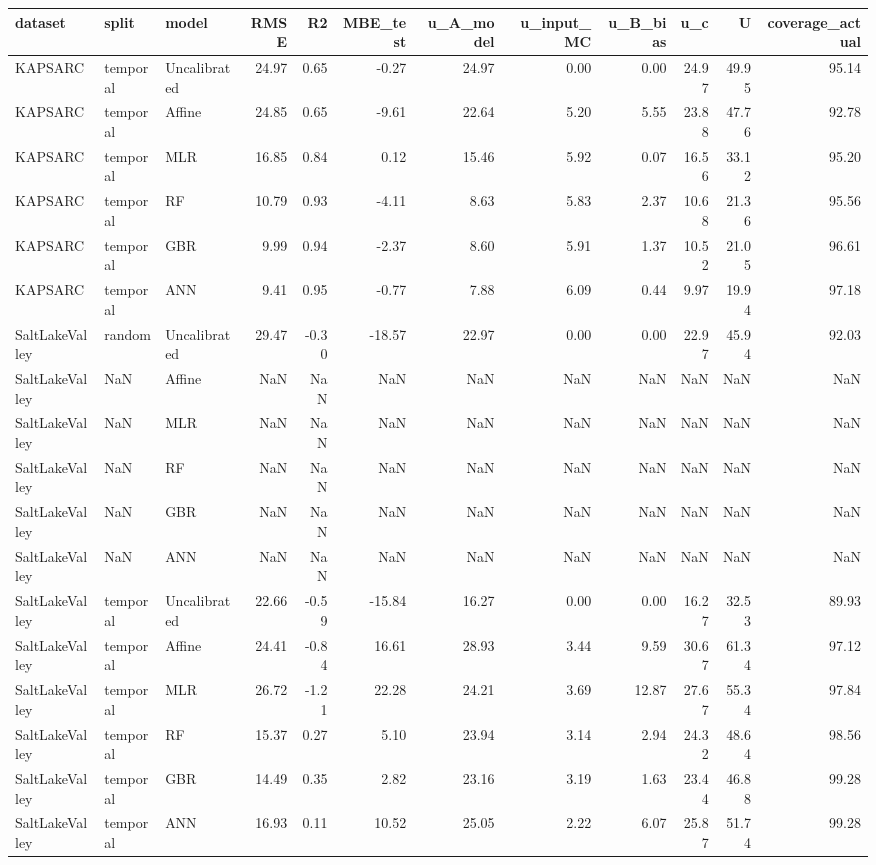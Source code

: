 \begin{tabular}{lllrrrrrrrrr}
\toprule
dataset & split & model & RMSE & R2 & MBE_test & u_A_model & u_input_MC & u_B_bias & u_c & U & coverage_actual \\
\midrule
KAPSARC & temporal & Uncalibrated & 24.97 & 0.65 & -0.27 & 24.97 & 0.00 & 0.00 & 24.97 & 49.95 & 95.14 \\
KAPSARC & temporal & Affine & 24.85 & 0.65 & -9.61 & 22.64 & 5.20 & 5.55 & 23.88 & 47.76 & 92.78 \\
KAPSARC & temporal & MLR & 16.85 & 0.84 & 0.12 & 15.46 & 5.92 & 0.07 & 16.56 & 33.12 & 95.20 \\
KAPSARC & temporal & RF & 10.79 & 0.93 & -4.11 & 8.63 & 5.83 & 2.37 & 10.68 & 21.36 & 95.56 \\
KAPSARC & temporal & GBR & 9.99 & 0.94 & -2.37 & 8.60 & 5.91 & 1.37 & 10.52 & 21.05 & 96.61 \\
KAPSARC & temporal & ANN & 9.41 & 0.95 & -0.77 & 7.88 & 6.09 & 0.44 & 9.97 & 19.94 & 97.18 \\
SaltLakeValley & random & Uncalibrated & 29.47 & -0.30 & -18.57 & 22.97 & 0.00 & 0.00 & 22.97 & 45.94 & 92.03 \\
SaltLakeValley & NaN & Affine & NaN & NaN & NaN & NaN & NaN & NaN & NaN & NaN & NaN \\
SaltLakeValley & NaN & MLR & NaN & NaN & NaN & NaN & NaN & NaN & NaN & NaN & NaN \\
SaltLakeValley & NaN & RF & NaN & NaN & NaN & NaN & NaN & NaN & NaN & NaN & NaN \\
SaltLakeValley & NaN & GBR & NaN & NaN & NaN & NaN & NaN & NaN & NaN & NaN & NaN \\
SaltLakeValley & NaN & ANN & NaN & NaN & NaN & NaN & NaN & NaN & NaN & NaN & NaN \\
SaltLakeValley & temporal & Uncalibrated & 22.66 & -0.59 & -15.84 & 16.27 & 0.00 & 0.00 & 16.27 & 32.53 & 89.93 \\
SaltLakeValley & temporal & Affine & 24.41 & -0.84 & 16.61 & 28.93 & 3.44 & 9.59 & 30.67 & 61.34 & 97.12 \\
SaltLakeValley & temporal & MLR & 26.72 & -1.21 & 22.28 & 24.21 & 3.69 & 12.87 & 27.67 & 55.34 & 97.84 \\
SaltLakeValley & temporal & RF & 15.37 & 0.27 & 5.10 & 23.94 & 3.14 & 2.94 & 24.32 & 48.64 & 98.56 \\
SaltLakeValley & temporal & GBR & 14.49 & 0.35 & 2.82 & 23.16 & 3.19 & 1.63 & 23.44 & 46.88 & 99.28 \\
SaltLakeValley & temporal & ANN & 16.93 & 0.11 & 10.52 & 25.05 & 2.22 & 6.07 & 25.87 & 51.74 & 99.28 \\
\bottomrule
\end{tabular}
